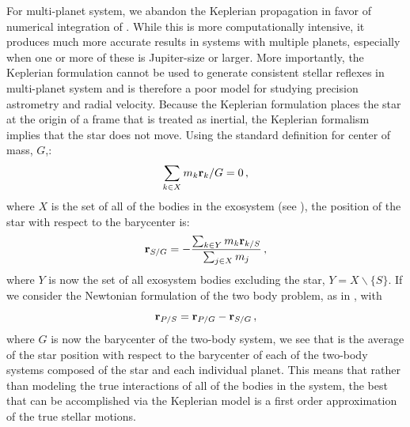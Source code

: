 For multi-planet system, we abandon the Keplerian propagation in favor of numerical integration of .  While this is more computationally intensive, it produces much more accurate results in systems with multiple planets, especially when one or more of these is Jupiter-size or larger.  More importantly, the Keplerian formulation cannot be used to generate consistent stellar reflexes in multi-planet system and is therefore a poor model for studying precision astrometry and radial velocity.  Because the Keplerian formulation places the star at the  origin of a frame that is treated as inertial, the Keplerian formalism implies that the star does not move.  Using the standard definition for center of mass, $G$,:
\begin{equation}
\sum_{k\in X}m_k \mathbf r_k/G = 0 \,,
\end{equation}
where $X$ is the set of all of the bodies in the exosystem (see ), the position of the star with respect to the barycenter is:
\begin{equation}\label{eq:keplerCOM}
\mathbf r_{S/G} = -\frac{\sum_{k \in Y} m_k \mathbf r_{k/S}}{\sum_{j \in X} m_j} \,,
\end{equation}
where $Y$ is now the set of all exosystem bodies excluding the star, $Y = X\backslash \{S\}$.  
If we consider the Newtonian formulation of the two body problem, as in , with 
\begin{equation}
\mathbf r_{P/S} = \mathbf r_{P/G} - \mathbf r_{S/G} \,,
\end{equation}
where $G$ is now the barycenter of the two-body system, we see that  is the average of the star position with respect to the barycenter of each of the two-body systems composed of the star and each individual planet.  This means that rather than modeling the true interactions of all of the bodies in the system, the best that can be accomplished via the Keplerian model is a first order approximation of the true stellar motions.

